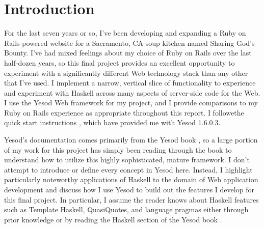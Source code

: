 \section{Introduction}

For the last seven years or so, I've been developing and expanding a Ruby on Rails-powered website for a Sacramento, CA soup kitchen named Sharing God's Bounty. I've had mixed feelings about my choice of Ruby on Rails over the last half-dozen years, so this final project provides an excellent opportunity to experiment with a significantly different Web technology stack than any other that I've used. I implement a narrow, vertical slice of functionality to experience and experiment with Haskell across many aspects of server-side code for the Web. I use the Yesod Web framework for my project, and I provide comparisons to my Ruby on Rails experience as appropriate throughout this report. I followethe quick start instructions \cite{yesodQuickstart}, which have provided me with Yesod 1.6.0.3.

Yesod's documentation comes primarily from the Yesod book \cite{ybk}, so a large portion of my work for this project has simply been reading through the book to understand how to utilize this highly sophisticated, mature framework. I don't attempt to introduce or define every concept in Yesod here. Instead, I highlight particularly noteworthy applications of Haskell to the domain of Web application development and discuss how I use Yesod to build out the features I develop for this final project. In particular, I assume the reader knows about Haskell features such as Template Haskell, QuasiQuotes, and language pragmas either through prior knowledge or by reading the Haskell section of the Yesod book \cite{ybkHaskell}.

